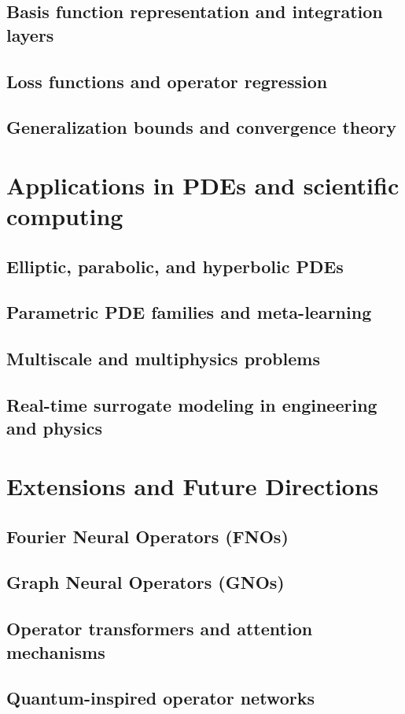 \subsection{Basis function representation and integration layers} %
\subsection{Loss functions and operator regression} %
\subsection{Generalization bounds and convergence theory} %

\section{Applications in PDEs and scientific computing}
\subsection{Elliptic, parabolic, and hyperbolic PDEs} %
\subsection{Parametric PDE families and meta-learning} %
\subsection{Multiscale and multiphysics problems} %
\subsection{Real-time surrogate modeling in engineering and physics} %

\section{Extensions and Future Directions} %
\subsection{Fourier Neural Operators (FNOs)} %
\subsection{Graph Neural Operators (GNOs)} %
\subsection{Operator transformers and attention mechanisms} %
\subsection{Quantum-inspired operator networks} %
